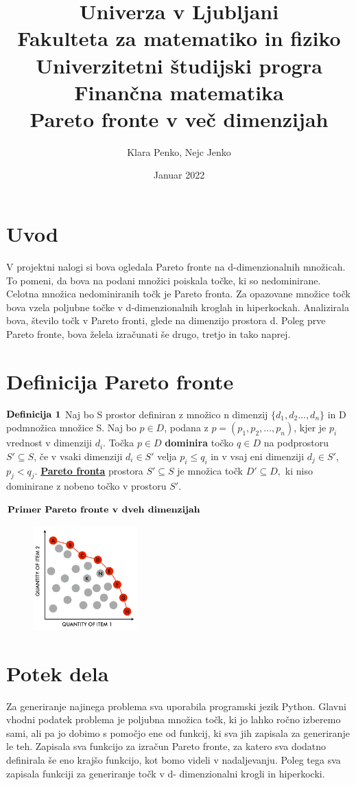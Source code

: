 \documentclass{article}
\title{
{\large{Univerza v Ljubljani}}\\ 
{\large{Fakulteta za matematiko in fiziko}}\\ 
{\large{Univerzitetni študijski progra Finančna matematika}}\\ 
\vspace{5cm}
{\textbf{Pareto fronte v več dimenzijah}
\vspace{5cm}}
}
\author{Klara Penko, Nejc Jenko}
\date{Januar 2022}
\begin{document}
\begin{titlepage}
    \maketitle
\end{titlepage}

\section{Uvod}
V projektni nalogi si bova ogledala Pareto fronte na d-dimenzionalnih množicah. To pomeni, da bova na podani množici poiskala točke, ki so nedominirane. Celotna množica nedominiranih točk je Pareto fronta.  Za opazovane množice točk bova vzela poljubne točke v d-dimenzionalnih kroglah in hiperkockah. Analizirala bova, število točk v Pareto fronti, glede na dimenzijo prostora d. Poleg prve Pareto fronte, bova želela izračunati še drugo, tretjo in tako naprej.

\section{Definicija Pareto fronte}
${\rm \textbf{Definicija 1}}$ Naj bo S prostor definiran z množico n dimenzij $\{d_{1},d_{2}\dots,d_{n}\}$ in D podmnožica množice S. Naj bo $p \in D$, podana z $p = (p_{1},p_{2},\dots,p_{n})$, kjer je $p_{i}$ vrednost v dimenziji $d_{i}$. Točka $p \in D$ \textbf{dominira} točko $q \in D$ na podprostoru $S'\subseteq S$, če v vsaki dimenziji $d_{i} \in S'$ velja $p_{i} \le q_{i}$ in v vsaj eni dimenziji $d_{j} \in S'$, $p_{j} < q_{j}$. 
\underline{\textbf{Pareto fronta}} prostora $S' \subseteq S$ je množica točk $D' \subseteq D,$ ki niso dominirane z nobeno točko v prostoru $S'$. \break
\break

${\rm \textbf{Primer Pareto fronte v dveh dimenzijah}}$

 \begin{figure}[htbp]
\includegraphics[width=4cm]{Slike/Slika_pareto_fronta.png}
\centering
\end{figure}

\section{Potek dela}
Za generiranje najinega problema sva uporabila programski jezik Python. Glavni vhodni podatek problema je poljubna množica točk, ki jo lahko ročno izberemo sami, ali pa jo dobimo s pomočjo ene od funkcij, ki sva jih zapisala za generiranje le teh. Zapisala sva funkcijo za izračun Pareto fronte, za katero sva dodatno definirala še eno krajšo funkcijo, kot bomo videli v nadaljevanju. Poleg tega sva zapisala funkciji za generiranje točk v d- dimenzionalni krogli in hiperkocki.
\end{document}
